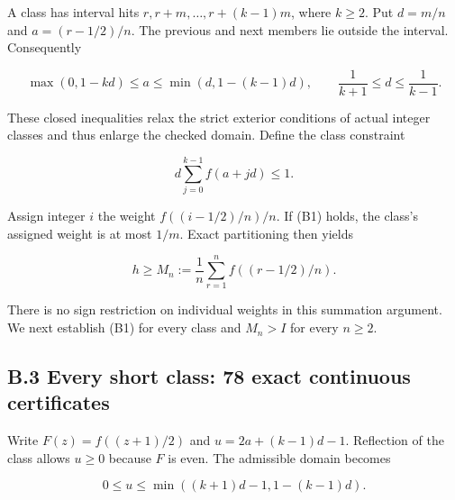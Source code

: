 \documentclass[11pt,a4paper]{article}
\begin{document}
\begin{samepage}

A class has interval hits \(r,r+m,\ldots,r+(k-1)m\), where \(k\ge2\).
Put \(d=m/n\) and \(a=(r-1/2)/n\). The previous and next members lie
outside the interval. Consequently

\[
\max(0,1-kd)\le a\le\min(d,1-(k-1)d),
\qquad \frac1{k+1}\le d\le\frac1{k-1}.
\]

\end{samepage}

\begin{samepage}

These closed inequalities relax the strict exterior conditions of actual
integer classes and thus enlarge the checked domain. Define the class
constraint

\[d\sum_{j=0}^{k-1}f(a+jd)\le1.\tag{B1}\]

\end{samepage}

\begin{samepage}

Assign integer \(i\) the weight \(f((i-1/2)/n)/n\). If (B1) holds, the
class's assigned weight is at most \(1/m\). Exact partitioning then
yields

\[h\ge M_n:=\frac1n\sum_{r=1}^n f((r-1/2)/n).\tag{B2}\]

\end{samepage}

There is no sign restriction on individual weights in this summation
argument. We next establish (B1) for every class and \(M_n>I\) for every
\(n\ge2\).


\hypertarget{b.3-every-short-class-78-exact-continuous-certificates}{%
\subsection{B.3 Every short class: 78 exact continuous
certificates}\label{b.3-every-short-class-78-exact-continuous-certificates}}

\begin{samepage}

Write \(F(z)=f((z+1)/2)\) and \(u=2a+(k-1)d-1\). Reflection of the class
allows \(u\ge0\) because \(F\) is even. The admissible domain becomes

\[0\le u\le\min((k+1)d-1,1-(k-1)d).\]

\end{samepage}
\end{document}
